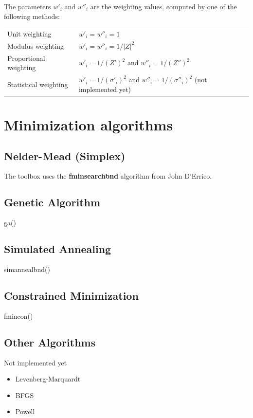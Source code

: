 \documentclass[10pt,b5paper,oneside]{book}
\begin{document}
The parameters $w'_i$ and $w''_i$ are the weighting values, computed by one of the following methods:

\begin{tabular}{ll}
	Unit weighting 			& $w'_i = w''_i = 1$ \\
	Modulus weighting 		& $w'_i = w''_i = 1/|Z|^2$ \\
	Proportional weighting 	& $w'_i = 1/(Z')^2$ and $w''_i = 1/(Z'')^2$ \\
	Statistical weighting 	& $w'_i = 1/(\sigma'_i)^2$ and $w''_i = 1/(\sigma''_i)^2$ (not implemented yet)\\
\end{tabular}


\newpage
\section{Minimization algorithms}

\subsection{Nelder-Mead (Simplex)}

The toolbox uses the \textbf{fminsearchbnd} algorithm from John D'Errico.

\subsection{Genetic Algorithm}

ga()

\subsection{Simulated Annealing}

simannealbnd()

\subsection{Constrained Minimization}

fmincon()

\subsection{Other Algorithms}

Not implemented yet

\begin{itemize}
	\item Levenberg-Marquardt
	\item BFGS
	\item Powell
\end{itemize}
\end{document}
